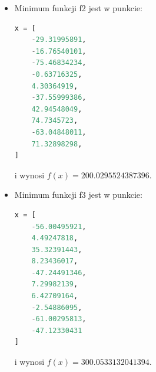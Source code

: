 \begin{itemize}
\begin{itemize}
			\item Minimum funkcji f2 jest w punkcie:
\begin{lstlisting}[language=Python]
x = [
	-29.31995891,
	-16.76540101,
	-75.46834234,
	-0.63716325,
	4.30364919,
	-37.55999386,
	42.94548049,
	74.7345723,
	-63.04848011,
	71.32898298,
]
\end{lstlisting}
			i wynosi $f(x) = 200.0295524387396$.
			\item Minimum funkcji f3 jest w punkcie:
\begin{lstlisting}[language=Python]
x = [
	-56.00495921,
	4.49247818,
	35.32391443,
	8.23436017,
	-47.24491346,
	7.29982139,
	6.42709164,
	-2.54886095,
	-61.00295813,
	-47.12330431
]
\end{lstlisting}
i wynosi $f(x) = 300.0533132041394$.
	\end{itemize}
	\end{itemize}


